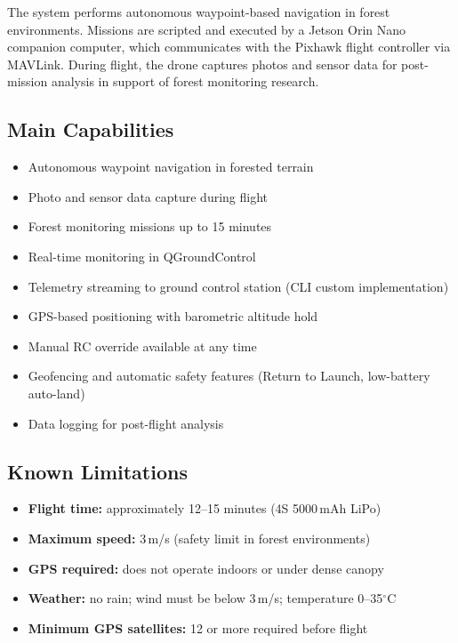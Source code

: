 \documentclass{article}
\begin{document}
The system performs autonomous waypoint-based navigation in forest environments. Missions are scripted and executed by a Jetson Orin Nano companion computer, which communicates with the Pixhawk flight controller via MAVLink. During flight, the drone captures photos and sensor data for post-mission analysis in support of forest monitoring research.

\subsection{Main Capabilities}

\begin{itemize}
    \item Autonomous waypoint navigation in forested terrain
    \item Photo and sensor data capture during flight
    \item Forest monitoring missions up to 15 minutes
    \item Real-time monitoring in QGroundControl
    \item Telemetry streaming to ground control station (CLI custom implementation)
    \item GPS-based positioning with barometric altitude hold
    \item Manual RC override available at any time
    \item Geofencing and automatic safety features (Return to Launch, low-battery auto-land)
    \item Data logging for post-flight analysis
\end{itemize}

\subsection{Known Limitations}

\begin{itemize}
    \item \textbf{Flight time:} approximately 12--15 minutes (4S 5000\,mAh LiPo)
    \item \textbf{Maximum speed:} 3\,m/s (safety limit in forest environments)
    \item \textbf{GPS required:} does not operate indoors or under dense canopy
    \item \textbf{Weather:} no rain; wind must be below 3\,m/s; temperature 0--35$^\circ$C
    \item \textbf{Minimum GPS satellites:} 12 or more required before flight
\end{itemize}
\end{document}
